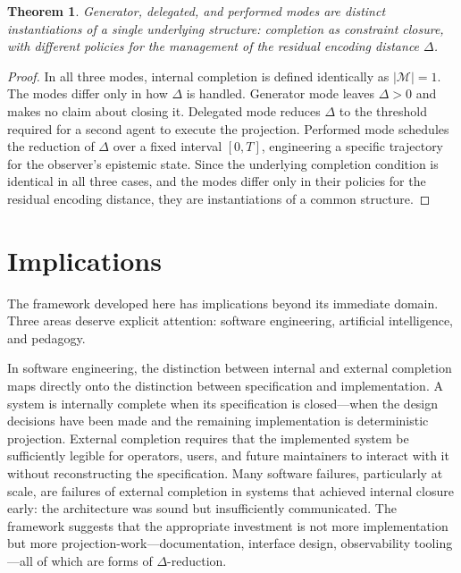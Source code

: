\documentclass[11pt, twoside]{article}
\theoremstyle{plain}
\newtheorem{theorem}{Theorem}[section]
\theoremstyle{definition}
\theoremstyle{remark}
\begin{document}
\begin{theorem}
\label{thm:three-modes}
Generator, delegated, and performed modes are distinct instantiations of a single underlying structure: completion as constraint closure, with different policies for the management of the residual encoding distance $\Delta$.
\end{theorem}

\begin{proof}
In all three modes, internal completion is defined identically as $|\mathcal{M}| = 1$. The modes differ only in how $\Delta$ is handled. Generator mode leaves $\Delta > 0$ and makes no claim about closing it. Delegated mode reduces $\Delta$ to the threshold required for a second agent to execute the projection. Performed mode schedules the reduction of $\Delta$ over a fixed interval $[0, T]$, engineering a specific trajectory for the observer's epistemic state. Since the underlying completion condition is identical in all three cases, and the modes differ only in their policies for the residual encoding distance, they are instantiations of a common structure.
\end{proof}

\section{Implications}
\label{sec:implications}

The framework developed here has implications beyond its immediate domain. Three areas deserve explicit attention: software engineering, artificial intelligence, and pedagogy.

In software engineering, the distinction between internal and external completion maps directly onto the distinction between specification and implementation. A system is internally complete when its specification is closed---when the design decisions have been made and the remaining implementation is deterministic projection. External completion requires that the implemented system be sufficiently legible for operators, users, and future maintainers to interact with it without reconstructing the specification. Many software failures, particularly at scale, are failures of external completion in systems that achieved internal closure early: the architecture was sound but insufficiently communicated. The framework suggests that the appropriate investment is not more implementation but more projection-work---documentation, interface design, observability tooling---all of which are forms of $\Delta$-reduction.
\end{document}
